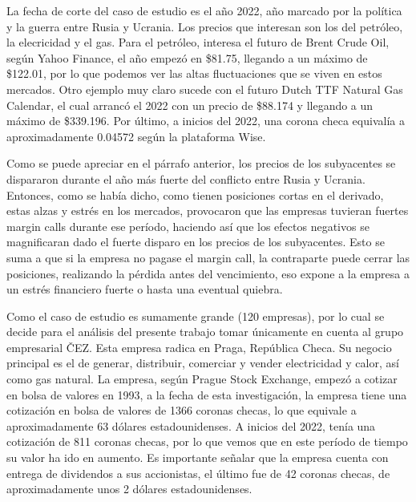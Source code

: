 \documentclass[11pt,letterpaper]{article}
\theoremstyle{plain}
\theoremstyle{definition}
\theoremstyle{remark}
\numberwithin{equation}{section}
\begin{document}
La fecha de corte del caso de estudio es el año 2022, año marcado por la política y la guerra entre Rusia y Ucrania. Los precios que interesan son los del petróleo, la elecricidad y el gas. Para el petróleo, interesa el futuro de Brent Crude Oil, según Yahoo Finance, el año empezó en \$81.75, llegando a un máximo de \$122.01, por lo que podemos ver las altas fluctuaciones que se viven en estos mercados. Otro ejemplo muy claro sucede con el futuro Dutch TTF Natural Gas Calendar, el cual arrancó el 2022 con un precio de \$88.174 y llegando a un máximo de \$339.196. Por último, a inicios del 2022, una corona checa equivalía a aproximadamente 0.04572 según la plataforma Wise.
\vspace{0.50 cm}

Como se puede apreciar en el párrafo anterior, los precios de los subyacentes se dispararon durante el año más fuerte del conflicto entre Rusia y Ucrania. Entonces, como se había dicho, como tienen posiciones cortas en el derivado, estas alzas y estrés en los mercados, provocaron que las empresas tuvieran fuertes margin calls durante ese período, haciendo así que los efectos negativos se magnificaran dado el fuerte disparo en los precios de los subyacentes. Esto se suma a que si la empresa no pagase el margin call, la contraparte puede cerrar las posiciones, realizando la pérdida antes del vencimiento, eso expone a la empresa a un estrés financiero fuerte o hasta una eventual quiebra. 


\vspace{0.50 cm}

Como el caso de estudio es sumamente grande (120 empresas), por lo cual se decide para el análisis del presente trabajo tomar únicamente en cuenta al grupo empresarial \v{C}EZ. Esta empresa radica en  Praga, República Checa. Su negocio principal es el de generar, distribuir, comerciar y vender electricidad y calor, así como gas natural. La empresa, según Prague Stock Exchange, empezó a cotizar en bolsa de valores en 1993, a la fecha de esta investigación, la empresa tiene una cotización en bolsa de valores de 1366 coronas checas, lo que equivale a aproximadamente 63 dólares estadounidenses. A inicios del 2022, tenía una cotización de 811 coronas checas, por lo que vemos que en este período de tiempo su valor ha ido en aumento. Es importante señalar que la empresa cuenta con entrega de dividendos a sus accionistas, el último fue de 42 coronas checas, de aproximadamente unos 2 dólares estadounidenses. 
\vspace{0.50 cm}
\end{document}
